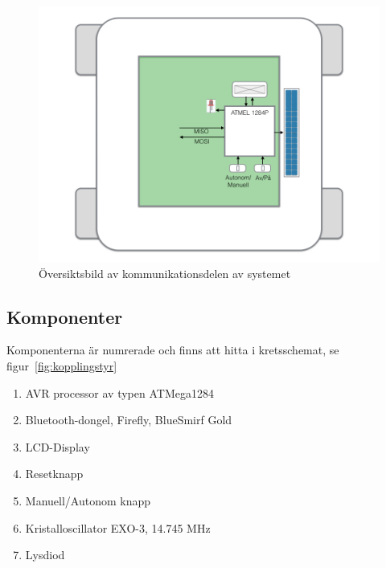 \documentclass[a4paper,12pt,fleqn]{article}
\begin{document}
\begin{figure}[htp] %
  \begin{center}
  \includegraphics[keepaspectratio=true,width=\linewidth]{bilder/kom_overview.png}  %
  \end{center}
  \caption{Översiktsbild av kommunikationsdelen av systemet} %
  \label{fig:overviewKom}
\end{figure}
\newpage

\subsection{Komponenter}
Komponenterna är numrerade och finns att hitta i kretsschemat, se figur~\ref{fig:kopplingstyr}
\begin{enumerate}
  \item AVR processor av typen ATMega1284
  \item Bluetooth-dongel, Firefly, BlueSmirf Gold
  \item LCD-Display
  \item Resetknapp
  \item Manuell/Autonom knapp
  \item Kristalloscillator EXO-3, 14.745 MHz
  \item Lysdiod
\end{enumerate}
\end{document}
